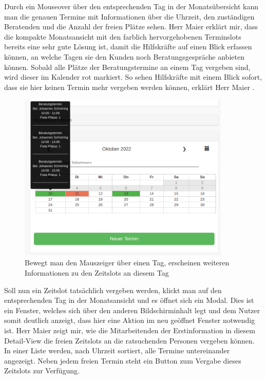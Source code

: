 \documentclass[12pt]{article}
\newcommand{\ipName}{Herr Maier }
\begin{document}
Durch ein Mouseover über den entsprechenden Tag in der Monatsübersicht kann man
die genauen Termine mit Informationen über die Uhrzeit, den zuständigen
Beratenden und die Anzahl der freien Plätze sehen. \ipName erklärt mir, dass
die kompakte Monatsansicht mit den farblich hervorgehobenen Terminslots bereits
eine sehr gute Lösung ist, damit die Hilfskräfte auf einen Blick erfassen
können, an welche Tagen sie den Kunden noch Beratungsgespräche anbieten können.
Sobald alle Plätze der Beratungstermine an einem Tag vergeben sind, wird dieser
im Kalender rot markiert. \glqq So sehen Hilfskräfte mit einem Blick sofort,
dass sie hier keinen Termin mehr vergeben werden können\grqq, erklärt \ipName
\cite{claves}.

\begin{figure}[h]
    \caption{Bewegt man den Mauszeiger über einen Tag, erscheinen weiteren Informationen zu den Zeitslots an diesem Tag}
    \centering
    \includegraphics[width=0.9\textwidth]{screen_old_hover.png}
\end{figure}

Soll nun ein Zeitslot tatsächlich vergeben werden, klickt man auf den
entsprechenden Tag in der Monatsansicht und es öffnet sich ein Modal. Dies ist
ein Fenster, welches sich über den anderen Bildschirminhalt legt und dem Nutzer
somit deutlich anzeigt, dass hier eine Aktion im neu geöffnet Fenster notwendig
ist. \ipName zeigt mir, wie die Mitarbeitenden der Erstinformation in diesem
Detail-View die freien Zeitslots an die ratsuchenden Personen vergeben können.
In einer Liste werden, nach Uhrzeit sortiert, alle Termine untereinander
angezeigt. Neben jedem freien Termin steht ein Button zum Vergabe dieses
Zeitslots zur Verfügung.
\end{document}
